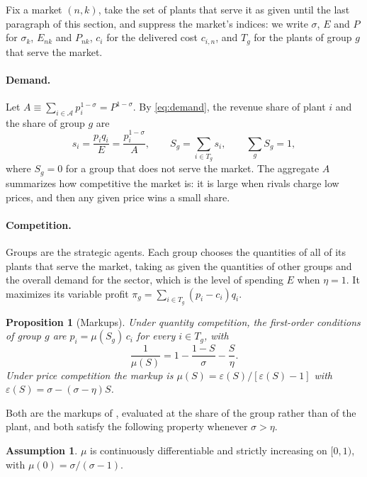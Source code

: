 \documentclass[11pt]{article}
\newtheorem{proposition}{Proposition}
\theoremstyle{definition}
\newtheorem{assumption}{Assumption}
\theoremstyle{remark}
\newcommand{\cA}{\mathcal A}
\begin{document}
Fix a market $(n,k)$, take the set of plants that serve it as given until the last
paragraph of this section, and suppress the market's indices: we write $\sigma$, $E$
and $P$ for $\sigma_k$, $E_{nk}$ and $P_{nk}$, $c_i$ for the delivered cost $c_{i,n}$,
and $T_g$ for the plants of group $g$ that serve the market.

\paragraph{Demand.} Let $A\equiv\sum_{i\in\cA}p_i^{1-\sigma}=P^{1-\sigma}$. By
\eqref{eq:demand}, the revenue share of plant $i$ and the share of group $g$ are
\begin{equation}
  s_i=\frac{p_iq_i}{E}=\frac{p_i^{1-\sigma}}{A},
  \qquad
  S_g=\sum_{i\in T_g}s_i,
  \qquad
  \sum_g S_g=1 ,
  \label{eq:shares}
\end{equation}
where $S_g=0$ for a group that does not serve the market. The aggregate $A$ summarizes
how competitive the market is: it is large when rivals charge low prices, and then any
given price wins a small share.

\paragraph{Competition.} Groups are the strategic agents. Each group chooses the
quantities of all of its plants that serve the market, taking as given the quantities
of other groups and the overall demand for the sector, which is the level of spending
$E$ when $\eta=1$. It maximizes its variable profit $\pi_g=\sum_{i\in T_g}(p_i-c_i)q_i$.

\begin{proposition}[Markups]\label{prop:markup}
Under quantity competition, the first-order conditions of group $g$ are
$p_i=\mu(S_g)\,c_i$ for every $i\in T_g$, with
\begin{equation}
  \frac{1}{\mu(S)}=1-\frac{1-S}{\sigma}-\frac{S}{\eta}.
  \label{eq:markupC}
\end{equation}
Under price competition the markup is $\mu(S)=\varepsilon(S)/[\varepsilon(S)-1]$ with
$\varepsilon(S)=\sigma-(\sigma-\eta)S$.
\end{proposition}

\noindent Both are the markups of \citet{AtkesonBurstein2008}, evaluated at the share
of the group rather than of the plant, and both satisfy the following property whenever
$\sigma>\eta$.

\begin{assumption}\label{as:mu}
$\mu$ is continuously differentiable and strictly increasing on $[0,1)$, with
$\mu(0)=\sigma/(\sigma-1)$.
\end{assumption}
\end{document}
